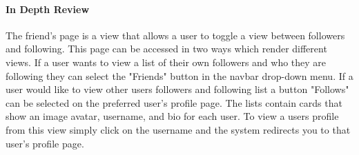 \paragraph{In Depth Review\newline}
The friend's page is a view that allows a user to toggle a view between followers and following. This page can be accessed in two ways which render different views. If a user wants to view a list of their own followers and who they are following they can select the "Friends" button in the navbar drop-down menu. If a user would like to view other users followers and following list a button "Follows" can be selected on the preferred user's profile page. The lists contain cards that show an image avatar, username, and bio for each user. To view a users profile from this view simply click on the username and the system redirects you to that user's profile page.
